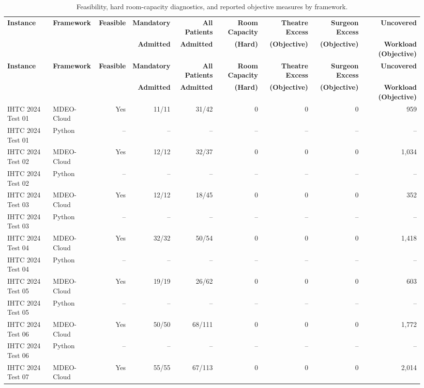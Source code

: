 \documentclass[11pt,a4paper]{article}
\begin{document}
\begin{landscape}
{\scriptsize
\setlength{\tabcolsep}{3pt}
\begin{longtable}{llrrrrrrr}
\caption{Feasibility, hard room-capacity diagnostics, and reported objective measures by framework.}\label{tab:feasibility-results}\\
\toprule
\textbf{Instance} & \textbf{Framework} & \textbf{Feasible} & \textbf{Mandatory} & \textbf{All Patients} & \textbf{Room Capacity} & \textbf{Theatre Excess} & \textbf{Surgeon Excess} & \textbf{Uncovered} \\
& & & \textbf{Admitted} & \textbf{Admitted} & \textbf{(Hard)} & \textbf{(Objective)} & \textbf{(Objective)} & \textbf{Workload (Objective)} \\
\midrule
\endfirsthead
\toprule
\textbf{Instance} & \textbf{Framework} & \textbf{Feasible} & \textbf{Mandatory} & \textbf{All Patients} & \textbf{Room Capacity} & \textbf{Theatre Excess} & \textbf{Surgeon Excess} & \textbf{Uncovered} \\
& & & \textbf{Admitted} & \textbf{Admitted} & \textbf{(Hard)} & \textbf{(Objective)} & \textbf{(Objective)} & \textbf{Workload (Objective)} \\
\midrule
\endhead
IHTC 2024 Test 01 & MDEO-Cloud & Yes & 11/11 & 31/42 & 0 & 0 & 0 & 959 \\
IHTC 2024 Test 01 & Python & -- & -- & -- & -- & -- & -- & -- \\
IHTC 2024 Test 02 & MDEO-Cloud & Yes & 12/12 & 32/37 & 0 & 0 & 0 & 1,034 \\
IHTC 2024 Test 02 & Python & -- & -- & -- & -- & -- & -- & -- \\
IHTC 2024 Test 03 & MDEO-Cloud & Yes & 12/12 & 18/45 & 0 & 0 & 0 & 352 \\
IHTC 2024 Test 03 & Python & -- & -- & -- & -- & -- & -- & -- \\
IHTC 2024 Test 04 & MDEO-Cloud & Yes & 32/32 & 50/54 & 0 & 0 & 0 & 1,418 \\
IHTC 2024 Test 04 & Python & -- & -- & -- & -- & -- & -- & -- \\
IHTC 2024 Test 05 & MDEO-Cloud & Yes & 19/19 & 26/62 & 0 & 0 & 0 & 603 \\
IHTC 2024 Test 05 & Python & -- & -- & -- & -- & -- & -- & -- \\
IHTC 2024 Test 06 & MDEO-Cloud & Yes & 50/50 & 68/111 & 0 & 0 & 0 & 1,772 \\
IHTC 2024 Test 06 & Python & -- & -- & -- & -- & -- & -- & -- \\
IHTC 2024 Test 07 & MDEO-Cloud & Yes & 55/55 & 67/113 & 0 & 0 & 0 & 2,014 \\

\end{longtable}}
\end{landscape}
\end{document}
